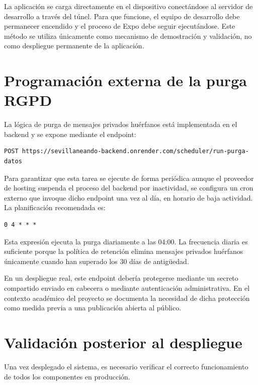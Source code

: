 La aplicación se carga directamente en el dispositivo conectándose al servidor de desarrollo a través del túnel. Para que funcione, el equipo de desarrollo debe permanecer encendido y el proceso de Expo debe seguir ejecutándose. Este método se utiliza únicamente como mecanismo de demostración y validación, no como despliegue permanente de la aplicación.

\section{Programación externa de la purga RGPD}

La lógica de purga de mensajes privados huérfanos está implementada en el backend y se expone mediante el endpoint:

\begin{lstlisting}
POST https://sevillaneando-backend.onrender.com/scheduler/run-purga-datos
\end{lstlisting}

Para garantizar que esta tarea se ejecute de forma periódica aunque el proveedor de hosting suspenda el proceso del backend por inactividad, se configura un cron externo que invoque dicho endpoint una vez al día, en horario de baja actividad. La planificación recomendada es:

\begin{lstlisting}
0 4 * * *
\end{lstlisting}

Esta expresión ejecuta la purga diariamente a las 04:00. La frecuencia diaria es suficiente porque la política de retención elimina mensajes privados huérfanos únicamente cuando han superado los 30 días de antigüedad.

En un despliegue real, este endpoint debería protegerse mediante un secreto compartido enviado en cabecera o mediante autenticación administrativa. En el contexto académico del proyecto se documenta la necesidad de dicha protección como medida previa a una publicación abierta al público.

\section{Validación posterior al despliegue}

Una vez desplegado el sistema, es necesario verificar el correcto funcionamiento de todos los componentes en producción.

